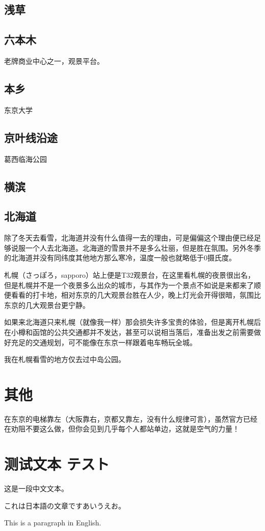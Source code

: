 \documentclass{article}
\newcommand{\jp}[1]{{\japanesefont #1}}
\begin{document}
\subsection{浅草}

\subsection{六本木}
老牌商业中心之一，观景平台。

\subsection{本乡}
东京大学

\subsection{京叶线沿途}
葛西临海公园

\subsection{横滨}

\subsection{北海道}
除了冬天去看雪，北海道并没有什么值得一去的理由，可是偏偏这个理由便已经足够说服一个人去北海道。北海道的雪景并不是多么壮丽，但是胜在氛围。另外冬季的北海道并没有同纬度其他地方那么寒冷，温度一般也就略低于0摄氏度。\par
札幌（さっぽろ，sapporo）站上便是T32观景台，在这里看札幌的夜景很出名，但是札幌并不是一个夜景多么出众的城市，与其作为一个景点不如说是来都来了顺便看看的打卡地，相对东京的几大观景台胜在人少，晚上灯光会开得很暗，氛围比东京的几大观景台更宁静。\par
如果来北海道只来札幌（就像我一样）那会损失许多宝贵的体验，但是离开札幌后在小樽和函馆的公共交通都并不发达，甚至可以说相当落后，准备出发之前需要做好充足的交通规划，可不能像在东京一样跟着电车畅玩全城。\par
我在札幌看雪的地方仅去过中岛公园。

\section{其他}
在东京的电梯靠左（大阪靠右，京都又靠左，没有什么规律可言），虽然官方已经在劝阻不要这么做，但你会见到几乎每个人都站单边，这就是空气的力量！

\section*{测试文本 テスト}
这是一段中文文本。\par
\jp{これは日本語の文章です}あいうえお。\par
This is a paragraph in English.
\end{document}
